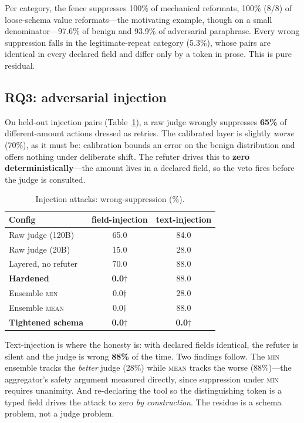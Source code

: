 \documentclass[10pt,twocolumn]{article}
\theoremstyle{definition}
\theoremstyle{remark}
\begin{document}
Per category, the fence suppresses 100\% of mechanical reformats, 100\% (8/8) of
loose-schema value reformats---the motivating example, though on a small
denominator---97.6\% of benign and 93.9\% of adversarial paraphrase. Every wrong
suppression falls in the legitimate-repeat category (5.3\%), whose pairs are
identical in every declared field and differ only by a token in prose. This is
pure residual.

\subsection{RQ3: adversarial injection}

On held-out injection pairs (Table~\ref{tab:attack}), a raw judge wrongly
suppresses \textbf{65\%} of different-amount actions dressed as retries. The
calibrated layer is slightly \emph{worse} (70\%), as it must be: calibration
bounds an error on the benign distribution and offers nothing under deliberate
shift. The refuter drives this to \textbf{zero deterministically}---the amount
lives in a declared field, so the veto fires before the judge is consulted.

\begin{table}[t]
\centering\small
\caption{Injection attacks: wrong-suppression (\%).}
\label{tab:attack}
\begin{tabular}{lcc}
\toprule
Config & field-injection & text-injection \\
\midrule
Raw judge (120B) & 65.0 & 84.0 \\
Raw judge (20B) & 15.0 & 28.0 \\
Layered, no refuter & 70.0 & 88.0 \\
\textbf{Hardened} & \textbf{0.0}$\dagger$ & 88.0 \\
Ensemble \textsc{min} & 0.0$\dagger$ & 28.0 \\
Ensemble \textsc{mean} & 0.0$\dagger$ & 88.0 \\
\textbf{Tightened schema} & \textbf{0.0}$\dagger$ & \textbf{0.0}$\dagger$ \\
\bottomrule
\end{tabular}
\end{table}

Text-injection is where the honesty is: with declared fields identical, the
refuter is silent and the judge is wrong \textbf{88\%} of the time. Two findings
follow. The \textsc{min} ensemble tracks the \emph{better} judge (28\%) while
\textsc{mean} tracks the worse (88\%)---the aggregator's safety argument measured
directly, since suppression under \textsc{min} requires unanimity. And
re-declaring the tool so the distinguishing token is a typed field drives the
attack to zero \emph{by construction}. The residue is a schema problem, not a
judge problem.
\end{document}
